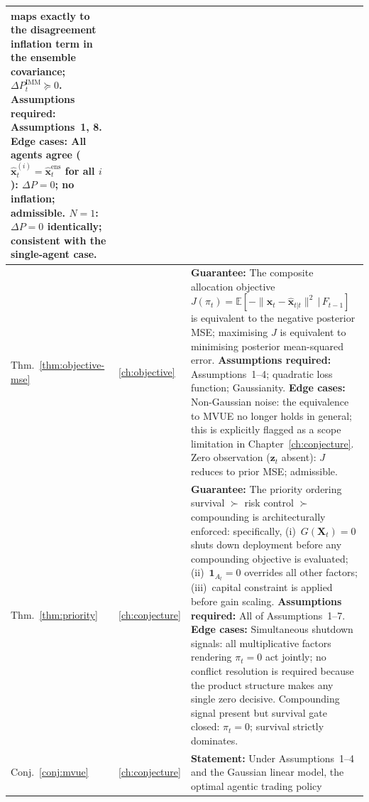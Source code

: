 \documentclass[12pt,openany]{book}
\numberwithin{equation}{chapter}
\theoremstyle{plain}
\theoremstyle{definition}
\theoremstyle{remark}
\def\mathcal#1{#1}%
\begin{document}
\begin{table}[H]
\begin{tabularx}{\linewidth}{@{} l l X @{}}
    maps exactly to the disagreement inflation term in the
    ensemble covariance; $\Delta P^{\mathrm{IMM}}_t \succeq 0$.
    \newline
    \textbf{Assumptions required:} Assumptions~1, 8.
    \newline
    \textbf{Edge cases:} All agents agree
    ($\hat{\mathbf{x}}^{(i)}_t = \hat{\mathbf{x}}^{\mathrm{ens}}_t$
    for all $i$): $\Delta P = 0$; no inflation; admissible.
    $N = 1$: $\Delta P = 0$ identically; consistent with the
    single-agent case. \\
\midrule
Thm.~\ref{thm:objective-mse}
  & \ref{ch:objective}
  & \textbf{Guarantee:} The composite allocation objective
    $J(\pi_t) = \mathbb{E}\!\left[-\bigl\|\mathbf{x}_t - \hat{\mathbf{x}}_{t|t}\bigr\|^2 \,\Big|\,\mathcal{F}_{t-1}\right]$
      is equivalent to the negative posterior MSE; maximising $J$
    is equivalent to minimising posterior mean-squared error.
    \newline
    \textbf{Assumptions required:} Assumptions~1--4; quadratic
    loss function; Gaussianity.
    \newline
    \textbf{Edge cases:} Non-Gaussian noise: the equivalence
    to MVUE no longer holds in general; this is explicitly flagged
    as a scope limitation in Chapter~\ref{ch:conjecture}.  Zero
    observation ($\mathbf{z}_t$ absent): $J$ reduces to prior
    MSE; admissible. \\
\midrule
Thm.~\ref{thm:priority}
  & \ref{ch:conjecture}
  & \textbf{Guarantee:} The priority ordering
    survival $\succ$ risk control $\succ$ compounding is
    architecturally enforced: specifically,
    (i)~$G(\mathbf{X}_t) = 0$ shuts down deployment before
    any compounding objective is evaluated;
    (ii)~$\mathbf{1}_{\mathcal{A}_t} = 0$ overrides all other
    factors; (iii)~capital constraint is applied before gain
    scaling.
    \newline
    \textbf{Assumptions required:} All of Assumptions~1--7.
    \newline
    \textbf{Edge cases:} Simultaneous shutdown signals: all
    multiplicative factors rendering $\pi_t = 0$ act jointly;
    no conflict resolution is required because the product
    structure makes any single zero decisive.
    Compounding signal present but survival gate closed:
    $\pi_t = 0$; survival strictly dominates. \\
\midrule
Conj.~\ref{conj:mvue}
  & \ref{ch:conjecture}
  & \textbf{Statement:} Under Assumptions~1--4 and the
    Gaussian linear model, the optimal agentic trading policy

\end{tabularx}
\end{table}
\end{document}
